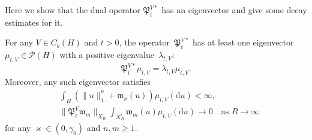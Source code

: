 \documentclass[AHL,Unicode,longabstracts]{cedram}
\newcommand{\PP}{{\mathcal P}}
\newcommand{\vk}{{\varkappa}}
\newcommand{\wwww}{{\mathfrak w}}
\newcommand{\mm}{{\mathfrak m}}
\newcommand{\PPPP}{{\mathfrak P}}
\newcommand{\dd}{\mathrm{d}}
\begin{document}
Here we show that the dual operator $\PPPP_t^{V*}$ has an eigenvector and give some decay estimates for it.

\begin{prop}\label{P:2.8}
For any $V\in C_b(H)$ and $t>0$, the operator~$\PPPP_t^{V*}$ has at least one eigenvector $\mu_{t,V}\in\PP(H)$ with a positive eigenvalue~$\lambda_{t,V}$:
\begin{equation}\label{6.22}
\PPPP_t^{V*}\mu_{t,V}=\lambda_{t,V}\mu_{t,V}.
\end{equation}
Moreover, any such eigenvector satisfies
\begin{align}
& \int_{H} \left(\|u\|_1^{n} + \mm_\vk (u) \right) \mu_{t,V}(\dd u)<\infty, \label{6.23}\\
&\|\PPPP_t^V\wwww_m\|_{ X_R }\int_{X_R^c}\wwww_m(u)\mu_{t,V}(\dd u)\to0\quad\text{as $R\to\infty$} \label{6.24}
\end{align}
for any $\vk\in (0,\gamma_0)$ and $n,m\ge1$.
\end{prop}
\end{document}
